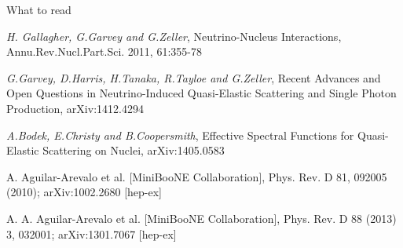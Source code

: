 \begin{frame}{What to read}

\begin{itemize}
{\scriptsize

\item
{\it H. Gallagher, G.Garvey and G.Zeller},
Neutrino-Nucleus Interactions,
Annu.Rev.Nucl.Part.Sci. 2011, 61:355-78

\item
{\it G.Garvey, D.Harris, H.Tanaka, R.Tayloe and G.Zeller},
Recent Advances and Open Questions in Neutrino-Induced Quasi-Elastic Scattering and Single Photon Production,
arXiv:1412.4294

\vspace{0.1cm}
\item
{\it A.Bodek, E.Christy and B.Coopersmith},
Effective Spectral Functions for Quasi-Elastic Scattering on Nuclei,
arXiv:1405.0583

\vspace{0.1cm}
\item
A. Aguilar-Arevalo et al. [MiniBooNE Collaboration],
Phys. Rev. D 81, 092005 (2010); arXiv:1002.2680 [hep-ex]

\vspace{0.1cm}
\item
A. A. Aguilar-Arevalo et al. [MiniBooNE Collaboration],
Phys. Rev. D 88 (2013) 3, 032001; arXiv:1301.7067 [hep-ex]

}
\end{itemize}

\end{frame}
